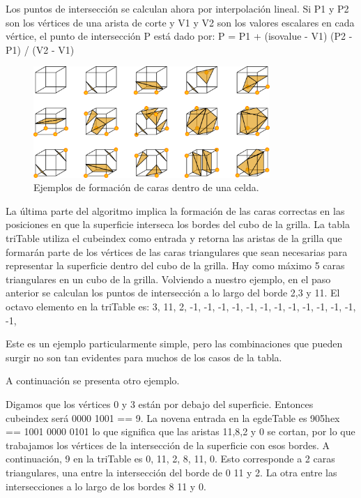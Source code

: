 \documentclass[12pt]{article}
\begin{document}
Los puntos de intersección se calculan ahora por interpolación lineal. Si P1 y P2 son los vértices de una arista de corte y V1 y V2 son los valores escalares en cada vértice, el punto de intersección P está dado por:
P = P1 + (isovalue - V1) (P2 - P1) / (V2 - V1)
\begin{figure}[h!]
\includegraphics[width=0.8\textwidth,center]{marchingcubes3.png}
\caption{Ejemplos de formación de caras dentro de una celda.}
\end{figure}

La última parte del algoritmo implica la formación de las caras correctas en las posiciones en que la superficie interseca los bordes del cubo de la grilla. La tabla triTable utiliza el cubeindex como entrada y retorna las aristas de la grilla que  formarán parte de los vértices de las caras triangulares que sean necesarias para representar la superficie dentro del cubo de la grilla. Hay como máximo 5 caras triangulares en un cubo de la grilla.
Volviendo a nuestro ejemplo, en el paso anterior se calculan los puntos de intersección a lo largo del borde 2,3 y 11. El octavo elemento en la triTable es:
{3, 11, 2, -1, -1, -1, -1, -1, -1, -1, -1, -1, -1, -1, -1, -1},

Este es un ejemplo particularmente simple, pero las combinaciones que pueden surgir no son tan evidentes para muchos de los casos de la tabla.

A continuación se presenta otro ejemplo.

Digamos que los vértices 0 y 3 están por debajo del superficie. Entonces cubeindex será 0000 1001 == 9. La novena entrada en la egdeTable es 905hex == 1001 0000 0101 lo que significa que las aristas 11,8,2 y 0 se cortan, por lo que trabajamos los vértices de la intersección de la superficie con esos bordes.
A continuación, 9 en la triTable es 0, 11, 2, 8, 11, 0. Esto corresponde a 2 caras triangulares, una entre la intersección del borde de 0 11 y 2. La otra entre las intersecciones a lo largo de los bordes 8 11 y 0.
\end{document}

